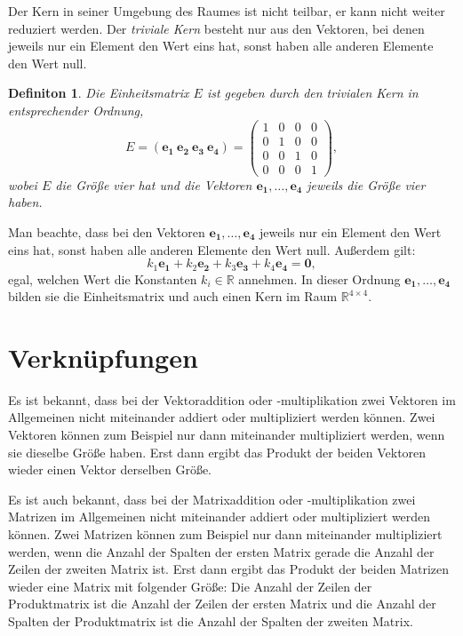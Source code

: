 \documentclass[oneside]{scrbook}
\newtheorem{definition}{Definiton}[section]
\numberwithin{equation}{section}
\begin{document}
Der Kern in seiner Umgebung des Raumes ist nicht teilbar, er kann nicht weiter reduziert werden. Der \textit{triviale Kern} besteht nur aus den Vektoren, bei denen jeweils nur ein Element den Wert eins hat, sonst haben alle anderen Elemente den Wert null.
\begin{definition}
	Die Einheitsmatrix $E$ ist gegeben durch den trivialen Kern in entsprechender Ordnung, $$ E = (\boldsymbol{e_1} \: \boldsymbol{e_2} \: \boldsymbol{e_3} \: \boldsymbol{e_4}) = 
	\begin{pmatrix}
		1 & 0 & 0 & 0 \\
		0 & 1 & 0 & 0 \\
		0 & 0 & 1 & 0 \\
		0 & 0 & 0 & 1
	\end{pmatrix},$$
wobei $E$ die Größe vier hat und die Vektoren $\boldsymbol{e_1}, \ldots, \boldsymbol{e_4}$  jeweils die Größe vier haben.
\end{definition}
Man beachte, dass bei den Vektoren $\boldsymbol{e_1}, \ldots, \boldsymbol{e_4}$ jeweils nur ein Element den Wert eins hat, sonst haben alle anderen Elemente den Wert null. Außerdem gilt:
$$ k_1\boldsymbol{e_1} + k_2\boldsymbol{e_2} + k_3\boldsymbol{e_3} + k_4\boldsymbol{e_4} = \boldsymbol{0},$$ egal, welchen Wert die Konstanten $k_i \in \mathbb{R} $ annehmen. In dieser Ordnung $\boldsymbol{e_1}, \ldots, \boldsymbol{e_4}$ bilden sie die Einheitsmatrix und auch einen Kern im Raum $\mathbb{R}^{4 \times 4}$. 

\section{Verknüpfungen}
Es ist bekannt, dass bei der Vektoraddition oder -multiplikation zwei Vektoren im Allgemeinen nicht miteinander addiert oder multipliziert werden können. Zwei Vektoren können zum Beispiel nur dann miteinander multipliziert werden, wenn sie dieselbe Größe haben. Erst dann ergibt das Produkt der beiden Vektoren wieder einen Vektor derselben Größe.

Es ist auch bekannt, dass bei der Matrixaddition oder -multiplikation zwei Matrizen im Allgemeinen nicht miteinander addiert oder multipliziert werden können. Zwei Matrizen können zum Beispiel nur dann miteinander multipliziert werden, wenn die Anzahl der Spalten der ersten Matrix gerade die Anzahl der Zeilen der zweiten Matrix ist. Erst dann ergibt das Produkt der beiden Matrizen wieder eine Matrix mit folgender Größe: Die Anzahl der Zeilen der Produktmatrix ist die Anzahl der Zeilen der ersten Matrix und die Anzahl der Spalten der Produktmatrix ist die Anzahl der Spalten der zweiten Matrix.
\end{document}
